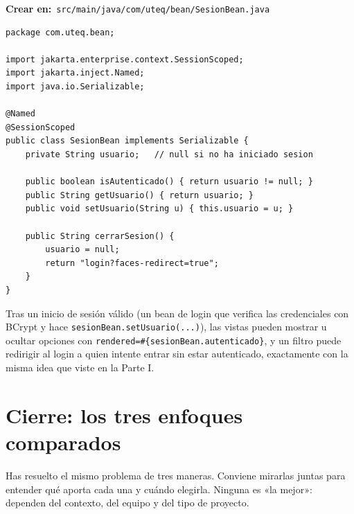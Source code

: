 \documentclass[11pt]{article}
\begin{document}
{\small\color{jwebazulo}\textbf{Crear en:}~}\texttt{src/\allowbreak{}main/\allowbreak{}java/\allowbreak{}com/\allowbreak{}uteq/\allowbreak{}bean/\allowbreak{}Sesion\allowbreak{}Bean.\allowbreak{}java}\par\nobreak\vspace{-1pt}
\begin{cajacodigo}
\begin{lstlisting}[style=java]
package com.uteq.bean;

import jakarta.enterprise.context.SessionScoped;
import jakarta.inject.Named;
import java.io.Serializable;

@Named
@SessionScoped
public class SesionBean implements Serializable {
    private String usuario;   // null si no ha iniciado sesion

    public boolean isAutenticado() { return usuario != null; }
    public String getUsuario() { return usuario; }
    public void setUsuario(String u) { this.usuario = u; }

    public String cerrarSesion() {
        usuario = null;
        return "login?faces-redirect=true";
    }
}
\end{lstlisting}
\end{cajacodigo}
\vspace{2pt}
Tras un inicio de sesión válido (un bean de login que verifica las credenciales con BCrypt y hace \texttt{sesion\allowbreak{}Bean.\allowbreak{}set\allowbreak{}Usuario(.\allowbreak{}.\allowbreak{}.\allowbreak{})}), las vistas pueden mostrar u ocultar opciones con \texttt{rendered=\allowbreak{}\#\{sesion\allowbreak{}Bean.\allowbreak{}autenticado\}}, y un filtro puede redirigir al login a quien intente entrar sin estar autenticado, exactamente con la misma idea que viste en la Parte I.

\section{Cierre: los tres enfoques comparados}
Has resuelto el mismo problema de tres maneras. Conviene mirarlas juntas para entender qué aporta cada una y cuándo elegirla. Ninguna es «la mejor»: dependen del contexto, del equipo y del tipo de proyecto.
\end{document}
